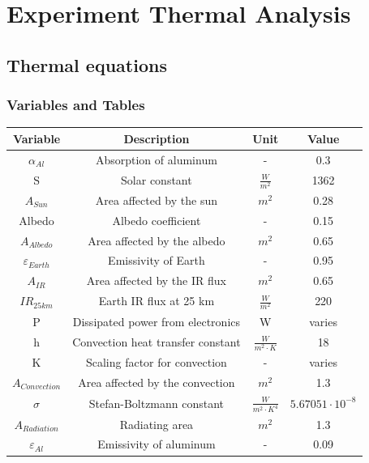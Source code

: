 \newpage
\color{blue}
\section{Experiment Thermal Analysis} \label{sec:appI}
\subsection{Thermal equations}

\subsubsection{Variables and Tables}
\begin{table}[H]
    \centering
    {\color{blue}\begin{tabular}{|c|c|c|c|}
        \hline
        \textbf{Variable} & \textbf{Description} & \textbf{Unit} & \textbf{Value} \\ \hline
        $\alpha_{Al}$ & Absorption of aluminum & - & 0.3 \\ \hline
        S & Solar constant & $\frac{W}{m^2}$ & 1362 \\ \hline
        $A_{Sun}$ & Area affected by the sun & $m^2$ & 0.28 \\ \hline
        Albedo & Albedo coefficient & - & 0.15 \\ \hline
        $A_{Albedo}$ & Area affected by the albedo & $m^2$ & 0.65 \\ \hline
        $\varepsilon_{Earth}$ & Emissivity of Earth & - & 0.95 \\ \hline
        $A_{IR}$ & Area affected by the IR flux & $m^2$ & 0.65 \\ \hline
        $IR_{25km}$ & Earth IR flux at 25 km & $\frac{W}{m^2}$ & 220 \\ \hline
        P & Dissipated power from electronics & W & varies \\ \hline
        h & Convection heat transfer constant & $\frac{W}{m^2 \cdot K}$ & 18 \\ \hline
        K & Scaling factor for convection & - & varies \\ \hline
        $A_{Convection}$ & Area affected by the convection & $m^2$ & 1.3 \\ \hline
        $\sigma$ & Stefan-Boltzmann constant & $\frac{W}{m^2 \cdot K^4}$ & $5.67051 \cdot 10^{-8}$ \\ \hline
        $A_{Radiation}$ & Radiating area & $m^2$ & 1.3\\ \hline
        $\varepsilon_{Al}$ & Emissivity of aluminum & - & 0.09 \\ \hline

\end{tabular}}
\end{table}
